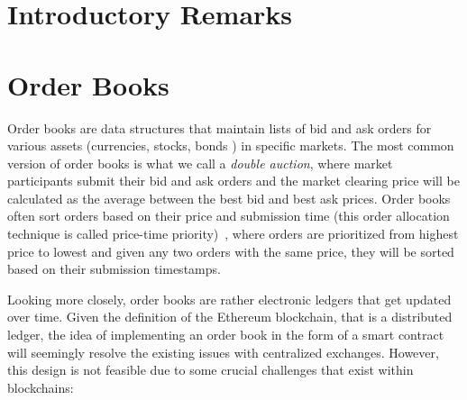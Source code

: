 

\section{Introductory Remarks}




%








\section{Order Books}

Order books are data structures that maintain lists of bid and ask orders for various assets (\eg currencies, stocks, bonds \etc) in specific markets. The most common version of order books is what we call a \textit{double auction}, where market participants submit their bid and ask orders and the market clearing price will be calculated as the average between the best bid and best ask prices. Order books often sort orders based on their price and submission time (this order allocation technique is called price-time priority)~\cite{preis2011price}, where orders are prioritized from highest price to lowest and given any two orders with the same price, they will be sorted based on their submission timestamps.

\par

Looking more closely, order books are rather electronic ledgers that get updated over time. Given the definition of the Ethereum blockchain, that is a distributed ledger, the idea of implementing an order book in the form of a smart contract will seemingly resolve the existing issues with centralized exchanges. However, this design is not feasible due to some crucial challenges that exist within blockchains:

